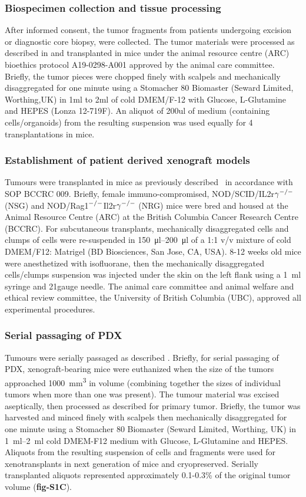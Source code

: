 \documentclass{article}
\begin{document}
\subsubsection{Biospecimen collection and tissue processing}
After informed consent, the tumor fragments from patients undergoing excision or diagnostic core biopsy, were collected. 
The tumor materials were processed as described in \cite {eirew2015dynamics} and transplanted in mice under the animal resource centre (ARC) bioethics protocol A19-0298-A001 approved by the animal care committee.
Briefly, the tumor pieces were chopped finely with scalpels and mechanically disaggregated for one minute using a Stomacher 80 Biomaster (Seward Limited, Worthing,UK) in 1ml to 2ml of cold DMEM/F-12 with Glucose, L-Glutamine and HEPES (Lonza 12-719F).
An aliquot of 200ul of medium (containing cells/organoids) from the resulting suspension was used equally for 4 transplantations in mice.

\subsubsection{Establishment of patient derived xenograft models}
Tumours were transplanted in mice as previously described~\cite{eirew2015dynamics} in accordance with SOP BCCRC 009. 
Briefly, female immuno-compromised, NOD/SCID/IL2r$\gamma^{\small{-/-}}$ (NSG) and NOD/Rag1$^{\small{-/-}}$Il2r$\gamma ^{\small{-/-}}$ (NRG)\cite{pearson2008non} mice were bred and housed at the Animal Resource Centre (ARC) at the British Columbia Cancer Research Centre (BCCRC). 
For subcutaneous transplants, mechanically disaggregated cells and clumps of cells were re-suspended in \SIrange{150}{200}{\ul} of a 1:1 v/v mixture of cold DMEM/F12: Matrigel (BD Biosciences, San Jose, CA, USA).
8-12 weeks old mice were anesthetized with isofluorane, then the mechanically disaggregated cells/clumps suspension was injected under the skin on the left flank using a \SI{1}{\ml} syringe and 21gauge needle. 
The animal care committee and animal welfare and ethical review committee, the University of British Columbia (UBC), approved all experimental procedures.

\subsubsection{Serial passaging of PDX}
Tumours were serially passaged as  described \cite{eirew2015dynamics}.
Briefly, for serial passaging of PDX, xenograft-bearing mice were euthanized when the size of the tumors approached \SI{1000}{\mm\cubed} in volume (combining together the sizes of individual tumors when more than one was present).
The tumour material was excised aseptically, then processed as described for primary tumor. 
Briefly, the tumor was harvested and minced finely with scalpels then mechanically disaggregated for one minute using a Stomacher 80 Biomaster (Seward Limited, Worthing, UK) in \SIrange{1}{2}{\ml} cold DMEM-F12 medium with Glucose, L-Glutamine and HEPES. 
Aliquots from the resulting suspension of cells and fragments were used for xenotransplants in next generation of mice and cryopreserved.
Serially transplanted aliquots represented approximately 0.1-0.3\%  of the original tumor volume (\textbf{fig-S1C}).
 
\end{document}
